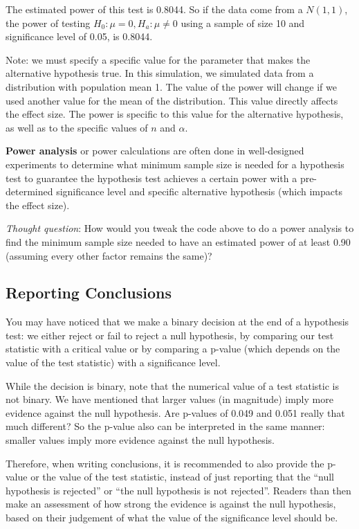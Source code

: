 \documentclass[
]{book}
\begin{document}
The estimated power of this test is 0.8044. So if the data come from a \(N(1,1)\), the power of testing \(H_0: \mu = 0, H_a: \mu \neq 0\) using a sample of size 10 and significance level of 0.05, is 0.8044.

Note: we must specify a specific value for the parameter that makes the alternative hypothesis true. In this simulation, we simulated data from a distribution with population mean 1. The value of the power will change if we used another value for the mean of the distribution. This value directly affects the effect size. The power is specific to this value for the alternative hypothesis, as well as to the specific values of \(n\) and \(\alpha\).

\textbf{Power analysis} or power calculations are often done in well-designed experiments to determine what minimum sample size is needed for a hypothesis test to guarantee the hypothesis test achieves a certain power with a pre-determined significance level and specific alternative hypothesis (which impacts the effect size).

\emph{Thought question}: How would you tweak the code above to do a power analysis to find the minimum sample size needed to have an estimated power of at least 0.90 (assuming every other factor remains the same)?

\subsection{Reporting Conclusions}\label{reporting-conclusions}

You may have noticed that we make a binary decision at the end of a hypothesis test: we either reject or fail to reject a null hypothesis, by comparing our test statistic with a critical value or by comparing a p-value (which depends on the value of the test statistic) with a significance level.

While the decision is binary, note that the numerical value of a test statistic is not binary. We have mentioned that larger values (in magnitude) imply more evidence against the null hypothesis. Are p-values of 0.049 and 0.051 really that much different? So the p-value also can be interpreted in the same manner: smaller values imply more evidence against the null hypothesis.

Therefore, when writing conclusions, it is recommended to also provide the p-value or the value of the test statistic, instead of just reporting that the ``null hypothesis is rejected'' or ``the null hypothesis is not rejected''. Readers than then make an assessment of how strong the evidence is against the null hypothesis, based on their judgement of what the value of the significance level should be.
\end{document}
